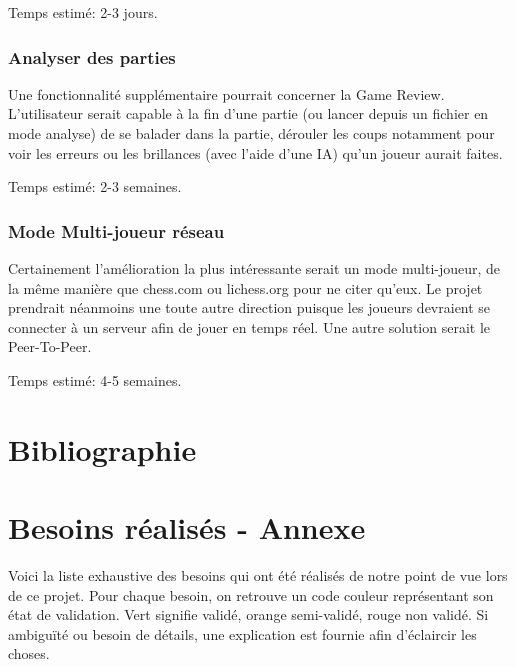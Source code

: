 \documentclass{article}
\begin{document}
Temps estimé: 2-3 jours.

\subsubsection{Analyser des parties}
Une fonctionnalité supplémentaire pourrait concerner la Game Review. L'utilisateur serait capable à la fin d'une partie (ou lancer depuis un fichier en mode
analyse) de se balader dans la partie, dérouler les coups notamment pour voir les erreurs ou les brillances (avec l'aide d'une IA) qu'un joueur aurait faites.

Temps estimé: 2-3 semaines.

\subsubsection{Mode Multi-joueur réseau}
Certainement l'amélioration la plus intéressante serait un mode multi-joueur, de la même manière que chess.com ou lichess.org pour ne citer qu'eux.
Le projet prendrait néanmoins une toute autre direction puisque les joueurs devraient se connecter à un serveur afin de jouer en temps réel. Une
autre solution serait le Peer-To-Peer.

Temps estimé: 4-5 semaines.

\pagebreak
\section{Bibliographie}
 
 

\pagebreak
\section{Besoins réalisés - Annexe}
\label{Spec}

Voici la liste exhaustive des besoins qui ont été réalisés de notre point de vue lors de ce projet. Pour chaque besoin, on retrouve un code couleur représentant
son état de validation. Vert signifie validé, orange semi-validé, rouge non validé. Si ambiguïté ou besoin de détails, une explication
est fournie afin d'éclaircir les choses.
\end{document}
